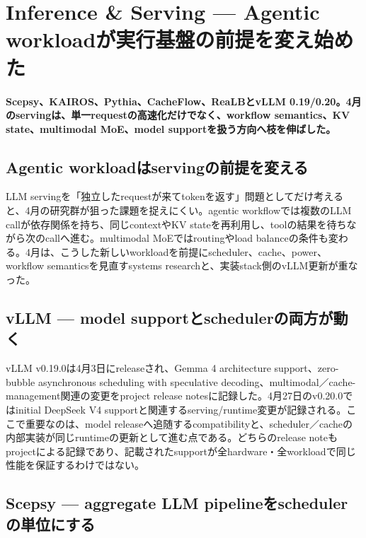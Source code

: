 \section{Inference \& Serving — Agentic workloadが実行基盤の前提を変え始めた}
\noindent\textbf{Scepsy、KAIROS、Pythia、CacheFlow、ReaLBとvLLM 0.19/0.20。4月のservingは、単一requestの高速化だけでなく、workflow semantics、KV state、multimodal MoE、model supportを扱う方向へ枝を伸ばした。}\autocite{src-0fc9d11483aa,src-2a6eae37bd39,src-551442a9e215,src-b790ec92aa01,src-d91793d0a6fa,src-e1e959857ced,src-fe12f92c05d7}

\subsection{Agentic workloadはservingの前提を変える}

LLM servingを「独立したrequestが来てtokenを返す」問題としてだけ考えると、4月の研究群が狙った課題を捉えにくい。agentic workflowでは複数のLLM callが依存関係を持ち、同じcontextやKV stateを再利用し、toolの結果を待ちながら次のcallへ進む。multimodal MoEではroutingやload balanceの条件も変わる。4月は、こうした新しいworkloadを前提にscheduler、cache、power、workflow semanticsを見直すsystems researchと、実装stack側のvLLM更新が重なった。\autocite{src-0fc9d11483aa,src-2a6eae37bd39,src-551442a9e215,src-b790ec92aa01,src-d91793d0a6fa,src-e1e959857ced,src-fe12f92c05d7}


\subsection{vLLM — model supportとschedulerの両方が動く}

vLLM v0.19.0は4月3日にreleaseされ、Gemma 4 architecture support、zero-bubble asynchronous scheduling with speculative decoding、multimodal／cache-management関連の変更をproject release notesに記録した。4月27日のv0.20.0ではinitial DeepSeek V4 supportと関連するserving/runtime変更が記録される。ここで重要なのは、model releaseへ追随するcompatibilityと、scheduler／cacheの内部実装が同じruntimeの更新として進む点である。どちらのrelease noteもprojectによる記録であり、記載されたsupportが全hardware・全workloadで同じ性能を保証するわけではない。\autocite{src-b790ec92aa01,src-fe12f92c05d7}


\subsection{Scepsy — aggregate LLM pipelineをschedulerの単位にする}

